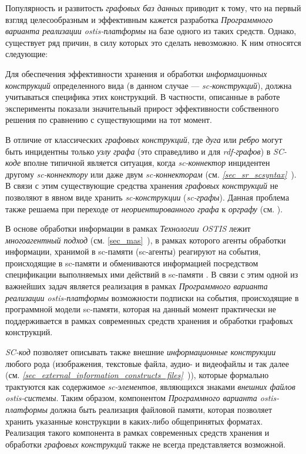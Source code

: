 Популярность и развитость \textit{графовых баз данных} приводит к тому, что на первый взгляд целесообразным и эффективным кажется разработка \textit{Программного варианта реализации ostis-платформы} на базе одного из таких средств. Однако, существует ряд причин, в силу которых это сделать невозможно. К ним относятся следующие:
\begin{textitemize}
	\item Для обеспечения эффективности хранения и обработки \textit{информационных конструкций} определенного вида (в данном случае --- \textit{sc-конструкций}), должна учитываться специфика этих конструкций. В частности, описанные в работе  эксперименты показали значительный прирост эффективности собственного решения по сравнению с существующими на тот момент.
	\item В отличие от классических \textit{графовых конструкций}, где \textit{дуга} или \textit{ребро} могут быть инцидентны только \textit{узлу} \textit{графа} (это справедливо и для \textit{rdf-графов}) в \textit{SC-коде} вполне типичной является ситуация, когда \textit{sc-коннектор} инцидентен другому \textit{sc-коннектору} или даже двум \textit{sc-коннекторам} (см. \textit{\ref{sec_sr_scsyntax}~}). В связи с этим существующие средства хранения \textit{графовых конструкций} не позволяют в явном виде хранить \textit{sc-конструкции} (\textit{sc-графы}). Данная проблема также решаема при переходе от \textit{неориентированного графа} к \textit{орграфу} (см. ).
	\item В основе обработки информации в рамках \textit{Технологии OSTIS} лежит \textit{многоагентный подход} (см. \ref{sec_mas}~), в рамках которого агенты обработки информации, хранимой в sc-памяти (sc-агенты) реагируют на события, происходящие в sc-памяти и обмениваются информацией посредством спецификации выполняемых ими действий в sc-памяти . В связи с этим одной из важнейших задач является реализация в рамках \textit{Программного варианта реализации ostis-платформы} возможности подписки на события, происходящие в программной модели sc-памяти, которая на данный момент практически не поддерживается в рамках современных средств хранения и обработки графовых конструкций.
	\item \textit{SC-код} позволяет описывать также внешние \textit{информационные конструкции} любого рода (изображения, текстовые файла, аудио- и видеофайлы и так далее (см. \textit{\ref{sec_external_information_constructs_files}~})), которые формально трактуются как содержимое \textit{sc-элементов}, являющихся знаками \textit{внешних файлов ostis-системы}. Таким образом, компонентом \textit{Программного варианта ostis-платформы} должна быть реализация файловой памяти, которая позволяет хранить указанные конструкции в каких-либо общепринятых форматах. Реализация такого компонента в рамках современных средств хранения и обработки \textit{графовых конструкций} также не всегда представляется возможной.
\end{textitemize}


